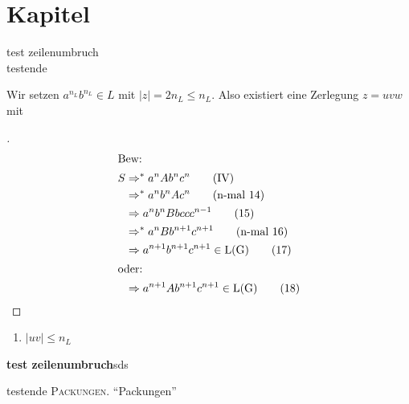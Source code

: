 \documentclass{scrartcl}
\begin{document}
\tableofcontents
{}

\section{Kapitel}
test zeilenumbruch\\
testende

Wir setzen \(a^{n_{L}}b^{n_{L}}\in L \) mit \(|z|=2n_{L}\leq n_L\). Also existiert eine Zerlegung \(z=uvw\) mit




  \begin{proof}[\nopunct]
  \begin{align*}
    \intertext{Bew:}
      S &\Rightarrow^* a^nAb^nc^n \tag{IV}\\
      &\Rightarrow^* a^nb^nAc^n \tag{n-mal 14}\\
      &\Rightarrow a^nb^nBbccc^{n-1} \tag{15}\\
      &\Rightarrow^* a^nBb^{n+1}c^{n+1} \tag{n-mal 16}\\
      &\Rightarrow a^{n+1}b^{n+1}c^{n+1}\in \text{L(G)} \tag{17}\\
      \intertext{oder:}
      &\Rightarrow a^{n+1}Ab^{n+1}c^{n+1}\in \text{L(G)} \tag{18}
  \end{align*}
  \end{proof}


\begin{enumerate}
  \item\(|uv|\leq n_L\)
\end{enumerate}


\textbf{test zeilenumbruch}sds

testende
\textsc{Packungen}.
\enquote{Packungen}
\end{document}
